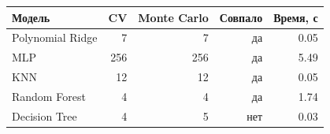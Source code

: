 \begin{center}
\small
\begin{tabular}{lrrrr}
\toprule
Модель & CV & Monte Carlo & Совпало & Время, с \\
\midrule
Polynomial Ridge & 7 & 7 & да & 0.05 \\
MLP & 256 & 256 & да & 5.49 \\
KNN & 12 & 12 & да & 0.05 \\
Random Forest & 4 & 4 & да & 1.74 \\
Decision Tree & 4 & 5 & нет & 0.03 \\
\bottomrule
\end{tabular}
\end{center}
